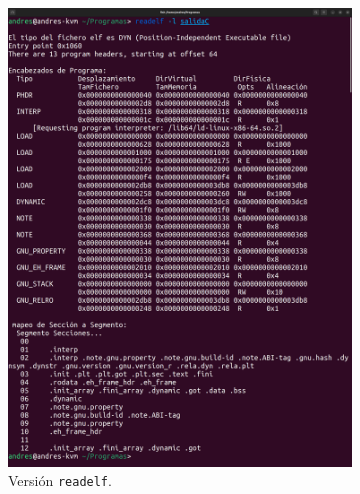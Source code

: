 \documentclass{article}
\begin{document}
\begin{itemize}
    \begin{figure}[H]
        \centering
        \begin{subfigure}{0.49\textwidth}
            \centering
            \includegraphics[width=\textwidth]{imagenes/mergedelfl.png}
            \caption{Versión \texttt{readelf}.}
        \end{subfigure}
        \hfill
        \begin{subfigure}{0.49\textwidth}
            \centering

\end{subfigure}
\end{figure}
\end{itemize}
\end{document}
